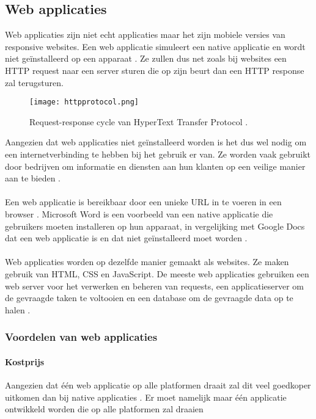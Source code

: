 \subsection{Web applicaties}
Web applicaties zijn niet echt applicaties maar het zijn mobiele versies van responsive websites. 
Een web applicatie simuleert een native applicatie en wordt niet geïnstalleerd op een 
apparaat \autocite{Beeproger2023}. Ze zullen dus net zoals bij websites een HTTP request naar 
een server sturen die op zijn beurt dan een HTTP response zal terugsturen.
\begin{figure}[H]
    \centering
    \texttt{[image: httpprotocol.png]}
    \caption{Request-response cycle van HyperText Transfer Protocol \parencite{Hartl2019}.}
\end{figure}
Aangezien dat web applicaties niet geïnstalleerd worden is het dus wel nodig om een internetverbinding 
te hebben bij het gebruik er van. Ze worden vaak gebruikt door bedrijven om informatie en diensten 
aan hun klanten op een veilige manier aan te bieden \autocite{Nehra2023}. 
\\\\
Een web applicatie is bereikbaar door een unieke URL in te voeren in een browser 
\autocite{Beeproger2023}. Microsoft Word is een voorbeeld van een native applicatie die 
gebruikers moeten installeren op hun apparaat, in vergelijking met Google Docs dat een web applicatie 
is en dat niet geïnstalleerd moet worden \autocite{Nehra2023}.
\\\\
Web applicaties worden op dezelfde manier gemaakt als websites. Ze maken gebruik van HTML, CSS en JavaScript. 
De meeste web applicaties gebruiken een web server voor het verwerken en beheren van requests, een 
applicatieserver om de gevraagde taken te voltooien en een database om de gevraagde data 
op te halen \autocite{Varsha2023}.

\subsubsection{Voordelen van web applicaties}\label{ch:VoordelenWebApplicaties}
\paragraph{Kostprijs}
Aangezien dat één web applicatie op alle platformen draait zal dit veel goedkoper uitkomen dan bij native 
applicaties \autocite{Laarhoven2021}. Er moet namelijk maar één applicatie ontwikkeld worden die op alle 
platformen zal draaien

